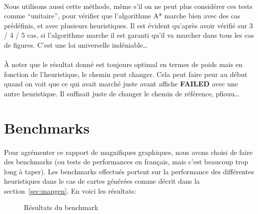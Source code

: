 \documentclass[french]{article}
\begin{document}
\paragraph{} Nous utilisons aussi cette méthode, même s'il on ne peut plus
considérer ces tests comme ``unitaire'', pour vérifier que l'algorithme A*
marche bien avec des cas prédéfinis, et avec plusieurs heuristiques. Il est
évident qu'après avoir vérifié sur 3 / 4 / 5 cas, si l'algorithme marche il
est garanti qu'il va marcher dans tous les cas de figures. C'est une loi
universelle indéniable\ldots

\paragraph{} À noter que le résultat donné est toujours optimal en termes de
poids mais en fonction de l'heuristique, le chemin peut changer. Cela peut
faire peur au début quand on voit que ce qui avait marché juste avant affiche
\textbf{FAILED} avec une autre heuristique. Il suffisait juste de changer le
chemin de référence, pfiouu\ldots

\section{Benchmarks}

\paragraph{} Pour agrémenter ce rapport de magnifiques graphiques, nous avons
choisi de faire des benchmarks (ou tests de performances en français, mais
c'est beaucoup trop long à taper). Les benchmarks effectués portent sur la
performance des différentes heuristiques dans le cas de cartes générées comme
décrit dans la section~\ref{sec:mapgen}. En voici les résultats:

\begin{figure}[H]
	\centering
	{
	}
	\caption{Résultats du benchmark}
	\label{fig:benchmarks}
\end{figure}
\end{document}
